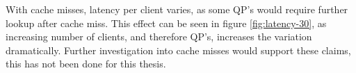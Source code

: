 With cache misses, latency per client varies, as some QP's would require further lookup after cache miss.
This effect can be seen in figure \ref{fig:latency-30}, as increasing number of clients, and therefore QP's, increases the variation dramatically.
Further investigation into cache misses would support these claims, this has not been done for this thesis.

